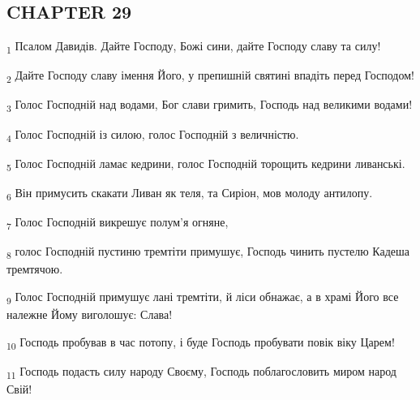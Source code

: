 \subsection{CHAPTER 29}
\begin{tcolorbox}
\textsubscript{1} Псалом Давидів. Дайте Господу, Божі сини, дайте Господу славу та силу!
\end{tcolorbox}
\begin{tcolorbox}
\textsubscript{2} Дайте Господу славу імення Його, у препишній святині впадіть перед Господом!
\end{tcolorbox}
\begin{tcolorbox}
\textsubscript{3} Голос Господній над водами, Бог слави гримить, Господь над великими водами!
\end{tcolorbox}
\begin{tcolorbox}
\textsubscript{4} Голос Господній із силою, голос Господній з величністю.
\end{tcolorbox}
\begin{tcolorbox}
\textsubscript{5} Голос Господній ламає кедрини, голос Господній торощить кедрини ливанські.
\end{tcolorbox}
\begin{tcolorbox}
\textsubscript{6} Він примусить скакати Ливан як теля, та Сиріон, мов молоду антилопу.
\end{tcolorbox}
\begin{tcolorbox}
\textsubscript{7} Голос Господній викрешує полум'я огняне,
\end{tcolorbox}
\begin{tcolorbox}
\textsubscript{8} голос Господній пустиню тремтіти примушує, Господь чинить пустелю Кадеша тремтячою.
\end{tcolorbox}
\begin{tcolorbox}
\textsubscript{9} Голос Господній примушує лані тремтіти, й ліси обнажає, а в храмі Його все належне Йому виголошує: Слава!
\end{tcolorbox}
\begin{tcolorbox}
\textsubscript{10} Господь пробував в час потопу, і буде Господь пробувати повік віку Царем!
\end{tcolorbox}
\begin{tcolorbox}
\textsubscript{11} Господь подасть силу народу Своєму, Господь поблагословить миром народ Свій!
\end{tcolorbox}
